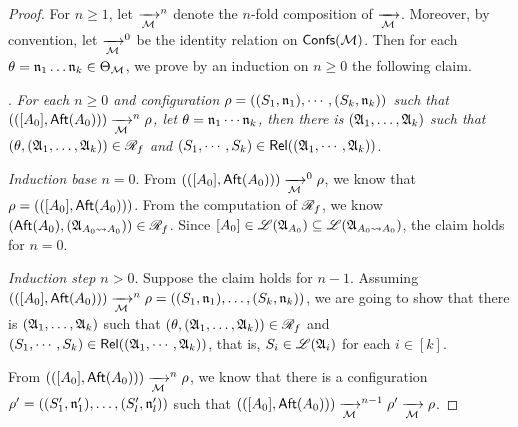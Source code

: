 \begin{proof}
    For $n \ge 1$, let $\xrightarrow[{\mathcal{M} }]{}^n$ denote the $n$-fold composition of $\xrightarrow[{\mathcal{M} }]{}$. Moreover, by convention, let $\xrightarrow[{\mathcal{M} }]{}^0$ be the identity relation on ${\mathsf{Confs} }({\mathcal{M} })$. 
    Then for each $\theta = \mathfrak{n}_1 \dots \mathfrak{n}_k \in \Theta_{\mathcal{M} }$, we prove by an induction on $n \ge 0$ the following claim.
    
    \smallskip
    
    . \emph{For each $n \ge 0$ and configuration $\rho =  ((S_1, \mathfrak{n}_1), \cdots, (S_k, \mathfrak{n}_k))$ such that 
    $(([A_0], {\sf Aft}(A_0))) \xrightarrow[{\mathcal{M} }]{}^n \rho$, let $\theta = \mathfrak{n}_1 \cdots \mathfrak{n}_k$, then  
    there is  $({\mathfrak{A} }_1, \dots, {\mathfrak{A} }_k)$ such that $(\theta, ({\mathfrak{A} }_1, \dots, {\mathfrak{A} }_k)) \in \mathscr{R}_f$ and $(S_1, \cdots, S_k) \in \mathsf{Rel}(({\mathfrak{A} }_1,\cdots, {\mathfrak{A} }_k))$}.   
    
    
    \smallskip
    
    \noindent \emph{Induction base $n = 0$}. From $(([A_0], {\sf Aft}(A_0))) \xrightarrow[{\mathcal{M} }]{}^0 \rho$, we know that $\rho = (([A_0], {\sf Aft}(A_0)))$. From the computation of $\mathscr{R}_f$, we know $({\sf Aft}(A_0), ({\mathfrak{A} }_{A_0\rightsquigarrow A_0})) \in \mathscr{R}_f$. Since $[A_0] \in {\mathscr{L} }({\mathfrak{A} }_{A_0})\subseteq{\mathscr{L} }({\mathfrak{A} }_{A_0\rightsquigarrow A_0})$, the claim holds for $n = 0$. 
    
    \smallskip
    
    \noindent \emph{Induction step $n > 0$}. Suppose the claim holds for $n-1$. Assuming $(([A_0], {\sf Aft}(A_0))) \xrightarrow[{\mathcal{M} }]{}^n \rho =  ((S_1, \mathfrak{n}_1), \dots, (S_k, \mathfrak{n}_k))$, we are going to show that there is  $({\mathfrak{A} }_1, \dots, {\mathfrak{A} }_k)$ such that $(\theta, ({\mathfrak{A} }_1, \dots, {\mathfrak{A} }_k)) \in \mathscr{R}_f$ and $(S_1, \cdots, S_k) \in \mathsf{Rel}(({\mathfrak{A} }_1,\cdots, {\mathfrak{A} }_k))$, that is, $S_i \in {\mathscr{L} }({\mathfrak{A} }_i)$ for each $i \in [k]$. 
    
    From $(([A_0], {\sf Aft}(A_0))) \xrightarrow[{\mathcal{M} }]{}^n \rho$,  we know that there is a configuration $\rho' = ((S'_1, \mathfrak{n}'_1), \dots, (S'_l, \mathfrak{n}'_l))$ such that $(([A_0], {\sf Aft}(A_0))) \xrightarrow[{\mathcal{M} }]{}^{n-1} \rho' \xrightarrow[{\mathcal{M} }]{} \rho$.
    

\end{proof}
